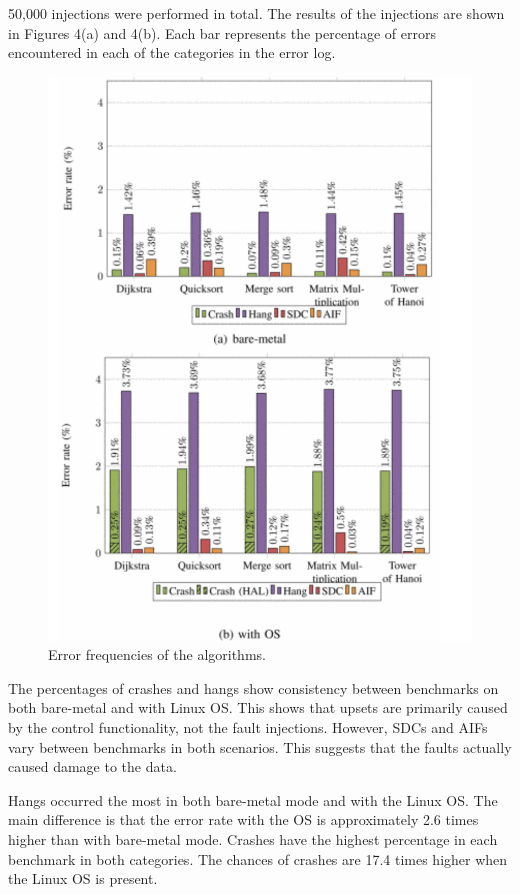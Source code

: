 \documentclass[conference]{IEEEtran}
\begin{document}
50,000 injections were performed in total. The results of the injections are shown in Figures 4(a) and 4(b). Each bar represents the percentage 
of errors encountered in each of the categories in the error log. 
\begin{figure}[ht]
    \centering
    \includegraphics[scale = 0.2]{results.jpg}
    \caption{Error frequencies of the algorithms.}
\end{figure}
The percentages of crashes and hangs show consistency between benchmarks on both bare-metal and with Linux OS. This shows that upsets are 
primarily caused by the control functionality, not the fault injections. However, SDCs and AIFs vary between benchmarks in both scenarios. 
This suggests that the faults actually caused damage to the data. 

Hangs occurred the most in both bare-metal mode and with the Linux OS. The main difference is that the error rate with the OS is 
approximately 2.6 times higher than with bare-metal mode. Crashes have the highest percentage in each benchmark in both categories. The 
chances of crashes are 17.4 times higher when the Linux OS is present.
\end{document}
